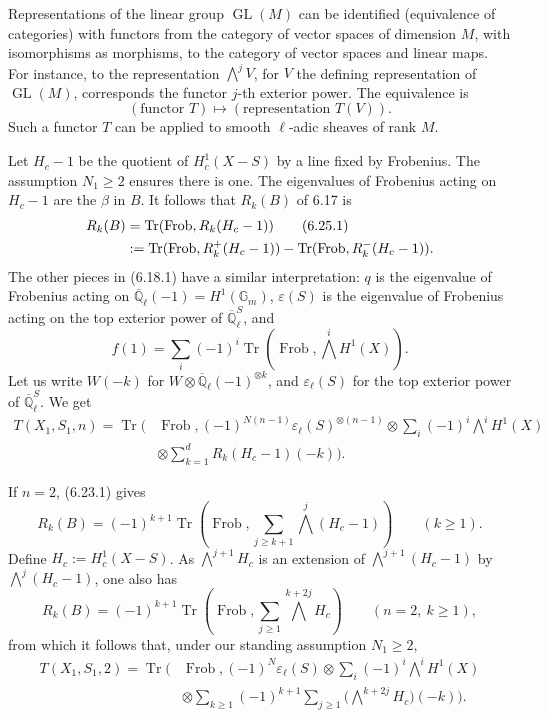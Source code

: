 \documentclass[10pt]{article}
\newcommand{\Ql}{\overline{\mathbb Q}_{\ell}}
\newcommand{\Gm}{\mathbb G_m}
\newcommand{\GL}{\operatorname{GL}}
\newcommand{\Frob}{\operatorname{Frob}}
\newcommand{\Tr}{\operatorname{Tr}}
\theoremstyle{deligne}
\newcommand{\heading}[1]{\vspace{0.7em}\noindent{\bfseries #1}\quad}
\begin{document}
\heading{6.24.} Representations of the linear group $\GL(M)$ can be identified (equivalence of categories) with functors from the category of vector spaces of dimension $M$, with isomorphisms as morphisms, to the category of vector spaces and linear maps. For instance, to the representation $\bigwedge^jV$, for $V$ the defining representation of $\GL(M)$, corresponds the functor $j$-th exterior power. The equivalence is
\[
(\text{functor }T)\longmapsto (\text{representation }T(V)).
\]
Such a functor $T$ can be applied to smooth $\ell$-adic sheaves of rank $M$.

\heading{6.25.} Let $H_c-1$ be the quotient of $H^1_c(X-S)$ by a line fixed by Frobenius. The assumption $N_1\ge2$ ensures there is one. The eigenvalues of Frobenius acting on $H_c-1$ are the $\beta$ in $B$. It follows that $R_k(B)$ of 6.17 is
\begin{align}
R_k(B)&=\Tr(\Frob,R_k(H_c-1))\tag{6.25.1}\\
&:=\Tr(\Frob,R_k^+(H_c-1))-\Tr(\Frob,R_k^-(H_c-1)).\notag
\end{align}
The other pieces in (6.18.1) have a similar interpretation: $q$ is the eigenvalue of Frobenius acting on $\Ql(-1)=H^1(\Gm)$, $\varepsilon(S)$ is the eigenvalue of Frobenius acting on the top exterior power of $\Ql^S$, and
\[
f(1)=\sum_i(-1)^i\Tr(\Frob,\bigwedge^iH^1(X)).
\]
Let us write $W(-k)$ for $W\otimes\Ql(-1)^{\otimes k}$, and $\varepsilon_\ell(S)$ for the top exterior power of $\Ql^S$. We get
\begin{equation}\tag{6.25.2}
\begin{aligned}
T(X_1,S_1,n)=\Tr\Bigg(&\Frob,
(-1)^{N(n-1)}\varepsilon_\ell(S)^{\otimes(n-1)}\otimes
\sum_i(-1)^i\bigwedge^iH^1(X)\\
&\otimes\sum_{k=1}^d R_k(H_c-1)(-k)\Bigg).
\end{aligned}
\end{equation}

\heading{Example 6.26.} If $n=2$, (6.23.1) gives
\[
R_k(B)=(-1)^{k+1}\Tr\left(\Frob,\sum_{j\ge k+1}\bigwedge^j(H_c-1)\right)\qquad(k\ge1).
\]
Define $H_c:=H^1_c(X-S)$. As $\bigwedge^{j+1}H_c$ is an extension of $\bigwedge^{j+1}(H_c-1)$ by $\bigwedge^j(H_c-1)$, one also has
\begin{equation}\tag{6.26.1}
R_k(B)=(-1)^{k+1}\Tr\left(\Frob,\sum_{j\ge1}\bigwedge^{k+2j}H_c\right)\qquad(n=2,\ k\ge1),
\end{equation}
from which it follows that, under our standing assumption $N_1\ge2$,
\begin{equation}\tag{6.26.2}
\begin{aligned}
T(X_1,S_1,2)=\Tr\Bigg(&\Frob,(-1)^N\varepsilon_\ell(S)\otimes
\sum_i(-1)^i\bigwedge^iH^1(X)\\
&\otimes\sum_{k\ge1}(-1)^{k+1}\sum_{j\ge1}\bigl(\bigwedge^{k+2j}H_c\bigr)(-k)\Bigg).
\end{aligned}
\end{equation}
\end{document}
